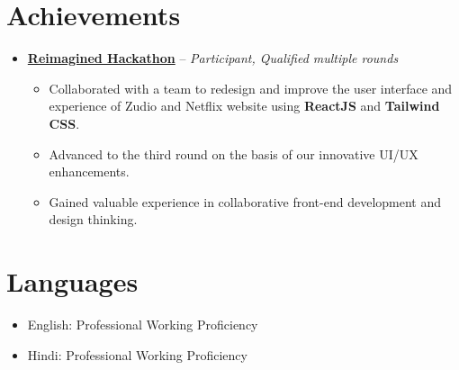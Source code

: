 \documentclass[letterpaper,11pt]{article}
\begin{document}

\section{\textbf{Achievements}}
\begin{itemize}[leftmargin=*, itemsep=-2pt]
    \item \textbf{\href{https://drive.google.com/file/d/16FwjfgjySoLkW6xeodaqY-EZWIAcXqqL/view?usp=sharing}{Reimagined Hackathon}} – \textit{Participant, Qualified multiple rounds}
    \begin{itemize}
        \item Collaborated with a team to redesign and improve the user interface and experience of  Zudio  and Netflix website using \textbf{ReactJS} and \textbf{Tailwind CSS}.
        \item Advanced to the third round on the basis of our innovative UI/UX enhancements.
        \item Gained valuable experience in collaborative front-end development and design thinking.
    \end{itemize}

    
\end{itemize}



\section{\textbf{Languages}}
\begin{itemize}[leftmargin=*, itemsep=-1.5pt]
    \item English: Professional Working Proficiency
    \item Hindi: Professional Working Proficiency
    
\end{itemize}
\end{document}
